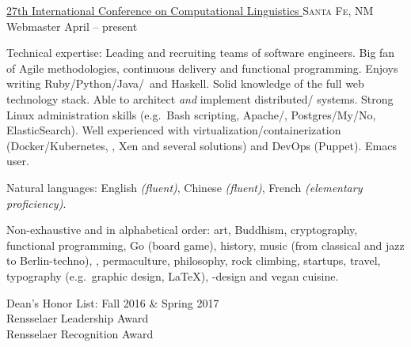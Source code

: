 \documentclass[10pt,a4paper]{article}
\begin{document}
\headedsection
  {\href{http://coling2018.org}{27th International Conference on Computational Linguistics }}
  {\textsc{Santa Fe, NM}} {%
  \headedsubsection
    {Webmaster}
    {April  -- present}
    {}
}





\spacedhrule{0.5em}{-0.4em}


\inlineheadsection  %
  {Technical expertise:}
  {Leading and recruiting teams of software engineers.  Big fan of Agile methodologies, continuous delivery and functional programming.  Enjoys writing Ruby/\nsp Python/\nsp Java/\nsp \CPP~and Haskell.  Solid knowledge of the full web technology stack.  Able to architect \textit{and} implement distributed/ systems.  Strong Linux administration skills (e.g.\ Bash scripting, Apache/, Postgres/My/No, ElasticSearch).  Well experienced with virtualization/containerization (Docker/Kubernetes, , Xen and several  solutions) and DevOps (Puppet).  Emacs user.}

\vspace{0.5em}
\inlineheadsection
  {Natural languages:}
  {English \emph{(fluent)}, Chinese \emph{(fluent)}, French \emph{(elementary proficiency)}.}


\spacedhrule{1.6em}{-0.4em}


\inlineheadsection
  {Non-exhaustive and in alphabetical order:}
  {art, Buddhism, cryptography, functional programming, Go (board game), history, music (from classical and jazz to Berlin-techno), , permaculture, philosophy, rock climbing, startups, travel, typography (e.g.\ graphic design, \LaTeX), -design and vegan cuisine.}

\spacedhrule{1.6em}{-0.4em}

  \indent Dean's Honor List: Fall 2016 \& Spring 2017 \\
  \indent Rensselaer Leadership Award \\      
  \indent Rensselaer Recognition Award \\ 
\end{document}
